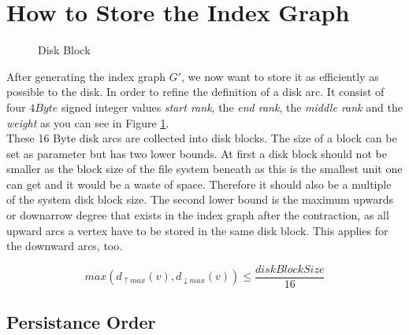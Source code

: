 \section{How to Store the Index Graph}\label{sec:how_to_store}

\begin{figure}
    \centering
    
\caption{Disk Block}
    \label{fig:disk_block}
\end{figure}

After generating the index graph $G'$, we now want to store it as efficiently as possible to the disk.
In order to refine the definition of a disk arc.
It consist of four $4 Byte$ signed integer values \textit{start rank}, the \textit{end rank}, the \textit{middle rank} and the \textit{weight} as you can see in Figure \ref{fig:disk_block}.
\\
These 16 Byte disk arcs are collected into disk blocks.
The size of a block can be set as parameter but has two lower bounds.
At first a disk block should not be smaller as the block size of the file system beneath as this is the smallest unit one can get and it would be a waste of space.
Therefore it should also be a multiple of the system disk block size.
The second lower bound is the maximum upwards or downarrow degree that exists in the index graph after the contraction, as all upward arcs a vertex have to be stored in the same disk block.
This applies for the downward arcs, too.

\begin{equation*}
    max(d_{\uparrow max}(v), d_{\downarrow max}(v)) \leqslant  \frac{diskBlockSize}{16}  
\end{equation*}

\subsection{Persistance Order}\label{sec:persistanceOrder}



